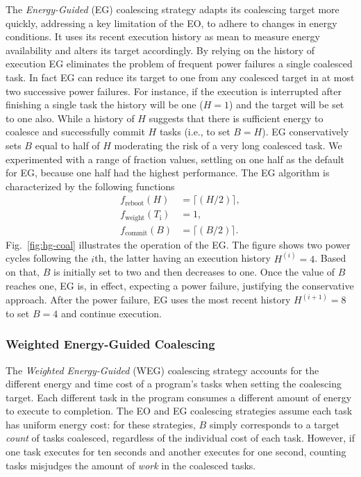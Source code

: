 The \emph{Energy-Guided} (EG) coalescing strategy adapts its coalescing target more quickly, addressing a key limitation of the EO, to adhere to changes in energy conditions. It uses its recent execution history as  mean to measure energy availability and alters its target accordingly. By relying on the history of execution EG eliminates the problem of frequent power failures a single coalesced task. In fact EG can reduce its target to one from any coalesced target in at most two successive power failures. For instance, if the execution is interrupted after finishing a single task the history will be one ($H = 1$) and the target will be set to one also. While a history of $H$ suggests that there is sufficient energy to coalesce and successfully commit $H$ tasks (i.e., to set $B = H$). EG conservatively sets $B$ equal to half of $H$ moderating the risk of a very long coalesced task. We experimented with a range of fraction values, settling on one half as the default for EG, because one half had the highest performance. The EG algorithm is characterized by the following functions
%
\begin{equation}
	\begin{split}
		 f_\text{reboot}(H) & = \lceil(H / 2)\rceil,\\
		 f_\text{weight}(T_\text{i}) & = 1, \\
		 f_\text{commit}(B) & = \lceil(B / 2)\rceil.
	\end{split}
\end{equation}
%
Fig.~\ref{fig:hg-coal} illustrates the operation of the EG. The figure shows two power cycles following the $i$th, the latter having an
execution history $H^{(i)} = 4$. Based on that, $B$ is initially set to two and then decreases to one. Once the value of $B$ reaches one, EG is, in effect, expecting a power failure, justifying the conservative approach. After the power failure, EG uses the most recent history $H^{(i+1)} = 8$ to set $B = 4$ and continue execution.

\subsubsection{Weighted Energy-Guided Coalescing}
\label{subsec:energyTaskAware}

The \emph{Weighted Energy-Guided} (WEG) coalescing strategy accounts for the different energy and time cost of a program's tasks when setting the coalescing target. Each different task in the program consumes a different amount of energy to execute to completion. The EO and EG coalescing strategies assume each task has uniform energy cost: for these strategies, $B$ simply corresponds to a target {\em count} of tasks coalesced, regardless of the individual cost of each task. However, if one task executes for ten seconds and another executes for one second, counting tasks misjudges the amount of {\em work} in the coalesced tasks.

